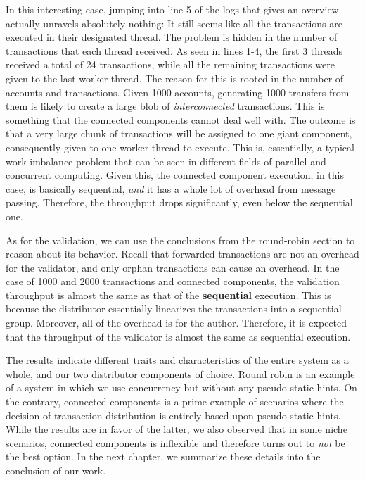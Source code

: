 In this interesting case, jumping into line 5 of the logs that gives an overview actually unravels
absolutely nothing: It still seems like all the transactions are executed in their designated
thread. The problem is hidden in the number of transactions that each thread received. As seen in
lines 1-4, the first 3 threads received a total of 24 transactions, while all the remaining
transactions were given to the last worker thread. The reason for this is rooted in the number of
accounts and transactions. Given 1000 accounts, generating 1000 transfers from them is likely to
create a large blob of \textit{interconnected} transactions. This is something that the connected
components cannot deal well with. The outcome is that a very large chunk of transactions will be
assigned to one giant component, consequently given to one worker thread to execute. This is,
essentially, a typical work imbalance problem that can be seen in different fields of parallel and
concurrent computing. Given this, the connected component execution, in this case, is basically
sequential, \textit{and} it has a whole lot of overhead from message passing. Therefore, the
throughput drops significantly, even below the sequential one.

As for the validation, we can use the conclusions from the round-robin section to reason about
its behavior. Recall that forwarded transactions are not an overhead for the validator, and only
orphan transactions can cause an overhead. In the case of 1000 and 2000 transactions and connected
components, the validation throughput is almost the same as that of the \textbf{sequential}
execution. This is because the distributor essentially linearizes the transactions into a sequential
group. Moreover, all of the overhead is for the author. Therefore, it is expected that the
throughput of the validator is almost the same as sequential execution.

The results indicate different traits and characteristics of the entire system as a whole, and
our two distributor components of choice. Round robin is an example of a system in which we use
concurrency but without any pseudo-static hints. On the contrary, connected components is a prime
example of scenarios where the decision of transaction distribution is entirely based upon
pseudo-static hints. While the results are in favor of the latter, we also observed that in some
niche scenarios, connected components is inflexible and therefore turns out to \textit{not} be the
best option. In the next chapter, we summarize these details into the conclusion of our work.
